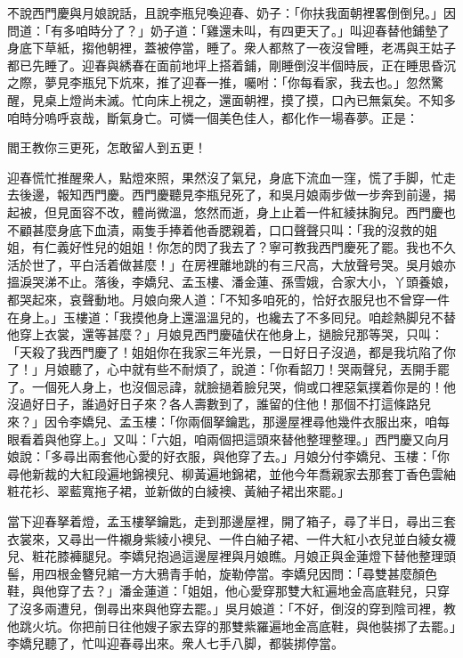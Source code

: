不說西門慶與月娘說話，且說李瓶兒喚迎春、奶子：「你扶我面朝裡畧倒倒兒。」因問道：「有多咱時分了？」奶子道：「雞還未叫，有四更天了。」叫迎春替他鋪墊了身底下草紙，搊他朝裡，蓋被停當，睡了。衆人都熬了一夜沒曾睡，老馮與王姑子都已先睡了。迎春與綉春在面前地坪上搭着鋪，剛睡倒沒半個時辰，正在睡思昏沉之際，夢見李瓶兒下炕來，推了迎春一推，囑咐：「你每看家，我去也。」忽然驚醒，見桌上燈尚未滅。忙向床上視之，還面朝裡，摸了摸，口內已無氣矣。不知多咱時分嗚呼哀哉，斷氣身亡。可憐一個美色佳人，都化作一場春夢。正是：

\begin{myquote}
閻王教你三更死，怎敢留人到五更！
\end{myquote}

迎春慌忙推醒衆人，點燈來照，果然沒了氣兒，身底下流血一窪，慌了手脚，忙走去後邊，報知西門慶。西門慶聽見李瓶兒死了，和吳月娘兩步做一步奔到前邊，揭起被，但見面容不改，體尚微溫，悠然而逝，身上止着一件紅綾抹胸兒。西門慶也不顧甚麼身底下血漬，兩隻手捧着他香腮親着，口口聲聲只叫：「我的沒救的姐姐，有仁義好性兒的姐姐！你怎的閃了我去了？寧可教我西門慶死了罷。我也不久活於世了，平白活着做甚麼！」在房裡離地跳的有三尺高，大放聲号哭。吳月娘亦搵淚哭涕不止。落後，李嬌兒、孟玉樓、潘金蓮、孫雪娥，合家大小，丫頭養娘，都哭起來，哀聲動地。月娘向衆人道：「不知多咱死的，恰好衣服兒也不曾穿一件在身上。」玉樓道：「我摸他身上還溫溫兒的，也纔去了不多囘兒。咱趁熱脚兒不替他穿上衣裳，還等甚麼？」月娘見西門慶磕伏在他身上，撾臉兒那等哭，只叫：「天殺了我西門慶了！姐姐你在我家三年光景，一日好日子沒過，{}都是我坑陷了你了！」{}月娘聽了，心中就有些不耐煩了，說道：「你看韶刀！哭兩聲兒，丟開手罷了。一個死人身上，也沒個忌諱，就臉撾着臉兒哭，倘或口裡惡氣撲着你是的！他沒過好日子，誰過好日子來？{}各人壽數到了，誰留的住他！那個不打這條路兒來？」因令李嬌兒、孟玉樓：「你兩個拏鑰匙，那邊屋裡尋他幾件衣服出來，咱每眼看着與他穿上。」又叫：「六姐，咱兩個把這頭來替他整理整理。」西門慶又向月娘說：「多尋出兩套他心愛的好衣服，與他穿了去。」月娘分付李嬌兒、玉樓：「你尋他新裁的大紅段遍地錦襖兒、柳黃遍地錦裙，並他今年喬親家去那套丁香色雲紬粧花衫、翠藍寬拖子裙，並新做的白綾襖、黃紬子裙出來罷。」

當下迎春拏着燈，孟玉樓拏鑰匙，走到那邊屋裡，開了箱子，尋了半日，尋出三套衣裳來，又尋出一件襯身紫綾小襖兒、{}一件白紬子裙、一件大紅小衣兒並白綾女襪兒、粧花膝褲腿兒。李嬌兒抱過這邊屋裡與月娘瞧。月娘正與金蓮燈下替他整理頭髻，用四根金簪兒綰一方大鴉青手帕，旋勒停當。李嬌兒因問：「尋雙甚麼顏色鞋，與他穿了去？」潘金蓮道：「姐姐，他心愛穿那雙大紅遍地金高底鞋兒，只穿了沒多兩遭兒，倒尋出來與他穿去罷。」吳月娘道：「不好，倒沒的穿到陰司裡，教他跳火坑。你把前日往他嫂子家去穿的那雙紫羅遍地金高底鞋，與他裝挷了去罷。」李嬌兒聽了，忙叫迎春尋出來。衆人七手八脚，都裝挷停當。

